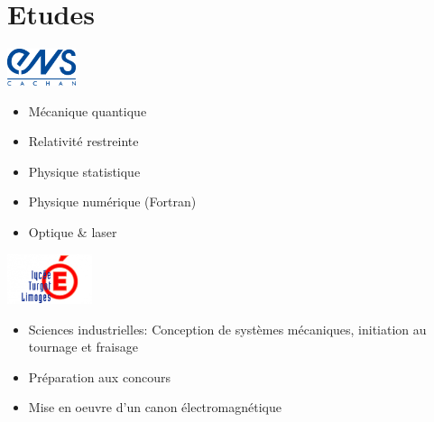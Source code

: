 \section{Etudes}

\noindent
\begin{minipage}{.15\textwidth}
\centerline{\includegraphics[width=20mm]{img/ens}}
\end{minipage}%
\hspace{5mm}
\begin{minipage}{.7\textwidth}
\raggedright
    \begin{itemize}
        \itemsep0em 
        \item Mécanique quantique
        \item Relativité restreinte
        \item Physique statistique
        \item Physique numérique (Fortran)
        \item Optique \& laser
    \end{itemize}
\end{minipage}

\noindent
\begin{minipage}{.15\textwidth}
\centerline{\includegraphics[width=25mm]{img/turgot}}
\end{minipage}%
\hspace{5mm}
\begin{minipage}{.7\textwidth}
\raggedright
    \begin{itemize}
        \itemsep0em 
        \item Sciences industrielles: Conception de systèmes mécaniques, initiation au tournage et fraisage
        \item Préparation aux concours
        \item Mise en oeuvre d'un canon électromagnétique
    \end{itemize}
\end{minipage}